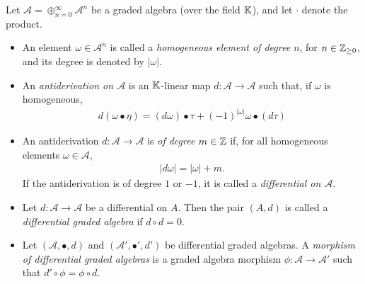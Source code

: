 \lin

\begin{definition} \label{defnDiffGAlgebra}
Let $\mathcal A = \oplus_{n = 0}^\infty \mathcal A^n$ be a graded algebra (over the field $\mathbb{K}$), and let $\cdot$ denote the product.
    \begin{itemize}
    
    \item An element $\omega \in \mathcal A^n$ is called a \emph{homogeneous element of degree $n$}, for $n \in \mathbb{Z}_{\geq 0}$, and its degree is denoted by $|\omega|$.
    
    \item An \emph{antiderivation on $\mathcal A$} is an $\mathbb{K}$-linear map $d: \mathcal A \to \mathcal A$ such that, if $\omega$ is homogeneous, 
    \begin{align*}
        d(\omega \bullet \eta) = (d\omega)\bullet\tau + (-1)^{|\omega|} \omega \bullet (d\tau)
    \end{align*}
    
    \item An antiderivation $d: \mathcal A \to \mathcal A$ is \emph{of degree $m \in \mathbb{Z}$} if, for all homogeneous elements $\omega \in \mathcal A$,
    \begin{align*}
        |d\omega| = |\omega| + m.
    \end{align*}
    If the antiderivation is of degree $1$ or $-1$, it is called a \emph{differential on $\mathcal A$}.
    
    \item Let $d: \mathcal A \to \mathcal A$ be a differential on $A$. Then the pair $(A, d)$ is called a \emph{differential graded algebra} if $d \circ d = 0$. 
    
    \item Let $(\mathcal A, \bullet, d)$ and $(\mathcal A', \bullet', d')$ be differential graded algebras. A \emph{morphism of differential graded algebras} is a graded algebra morphism $\phi: \mathcal A \to \mathcal A'$ such that $d' \circ \phi = \phi \circ d$.
    
    \end{itemize}
    
\end{definition}


